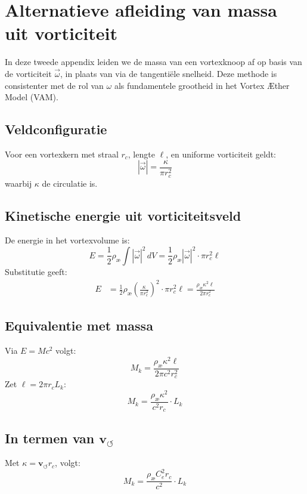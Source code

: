 \section{Alternatieve afleiding van massa uit vorticiteit}

In deze tweede appendix leiden we de massa van een vortexknoop af op basis van de vorticiteit \( \vec{\omega} \), in plaats van via de tangentiële snelheid. Deze methode is consistenter met de rol van \( \omega \) als fundamentele grootheid in het Vortex Æther Model (VAM).

\subsection{Veldconfiguratie}
Voor een vortexkern met straal \( r_c \), lengte \( \ell \), en uniforme vorticiteit geldt:
\begin{equation}
    |\vec{\omega}| = \frac{\kappa}{\pi r_c^2}
\end{equation}
waarbij \( \kappa \) de circulatie is.

\subsection{Kinetische energie uit vorticiteitsveld}
De energie in het vortexvolume is:
\begin{equation}
    E = \frac{1}{2} \rho_\text{\ae} \int |\vec{\omega}|^2 \, dV = \frac{1}{2} \rho_\text{\ae} |\vec{\omega}|^2 \cdot \pi r_c^2 \ell
\end{equation}
Substitutie geeft:
\begin{align}
    E &= \frac{1}{2} \rho_\text{\ae} \left( \frac{\kappa}{\pi r_c^2} \right)^2 \cdot \pi r_c^2 \ell = \frac{\rho_\text{\ae} \kappa^2 \ell}{2 \pi r_c^2}
\end{align}

\subsection{Equivalentie met massa}
Via \( E = M c^2 \) volgt:
\begin{equation}
    M_k = \frac{\rho_\text{\ae} \kappa^2 \ell}{2 \pi c^2 r_c^2}
\end{equation}
Zet \( \ell = 2 \pi r_c L_k \):
\begin{equation}
    M_k = \frac{\rho_\text{\ae} \kappa^2}{c^2 r_c} \cdot L_k
\end{equation}

\subsection{In termen van \( \mathbf{v}_{\scriptscriptstyle\boldsymbol{\circlearrowleft}} \)}
Met \( \kappa = \mathbf{v}_{\scriptscriptstyle\boldsymbol{\circlearrowleft}} r_c \), volgt:
\begin{equation}
    M_k = \frac{\rho_\text{\ae} C_e^2 r_c}{c^2} \cdot L_k
\end{equation}

